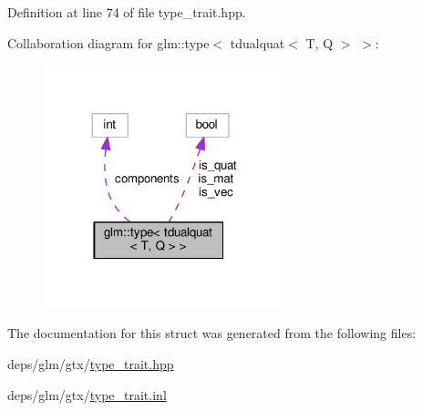 Definition at line 74 of file type\+\_\+trait.\+hpp.



Collaboration diagram for glm\+:\+:type$<$ tdualquat$<$ T, Q $>$ $>$\+:
\nopagebreak
\begin{figure}[H]
\begin{center}
\leavevmode
\includegraphics[width=200pt]{db/d57/structglm_1_1type_3_01tdualquat_3_01T_00_01Q_01_4_01_4__coll__graph}
\end{center}
\end{figure}


The documentation for this struct was generated from the following files\+:\begin{DoxyCompactItemize}
\item 
deps/glm/gtx/\hyperlink{type__trait_8hpp}{type\+\_\+trait.\+hpp}\item 
deps/glm/gtx/\hyperlink{type__trait_8inl}{type\+\_\+trait.\+inl}\end{DoxyCompactItemize}
